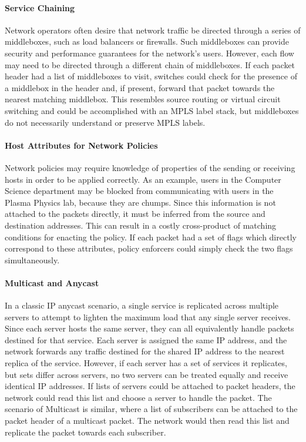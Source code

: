 \paragraph{Service Chaining}
Network operators often desire that network traffic be directed through a series of middleboxes, such as load balancers or firewalls. Such middleboxes can provide security and performance guarantees for the network's users.
 However, each flow may need to be directed through a different chain of middleboxes. If each packet header had a list of middleboxes to visit, switches could check for the presence of a middlebox in the header and, if present, forward that packet towards the nearest matching middlebox. This resembles source routing or virtual circuit switching and could be accomplished with an MPLS label stack, but middleboxes do not necessarily understand or preserve MPLS labels. 

\paragraph{Host Attributes for Network Policies}
Network policies may require knowledge of properties of the sending or receiving hosts in order to be applied correctly. As an example, users in the Computer Science department may be blocked from communicating with users in the Plasma Physics lab, because they are chumps. Since this information is not attached to the packets directly, it must be inferred from the source and destination addresses. This can result in a costly cross-product of matching conditions for enacting the policy. If each packet had a set of flags which directly correspond to these attributes, policy enforcers could simply check the two flags simultaneously. 


\paragraph{Multicast and Anycast}
In a classic IP anycast scenario, a single service is replicated across multiple servers to attempt to lighten the maximum load that any single server receives. Since each server hosts the same server, they can all equivalently handle packets destined for that service. Each server is assigned the same IP address, and the network forwards any traffic destined for the shared IP address to the nearest replica of the service. However, if each server has a set of services it replicates, but sets differ across servers, no two servers can be treated equally and receive identical IP addresses. If lists of servers could be attached to packet headers, the network could read this list and choose a server to handle the packet. 
The scenario of Multicast is similar, where a list of subscribers can be attached to the packet header of a multicast packet. The network would then read this list and replicate the packet towards each subscriber. 
